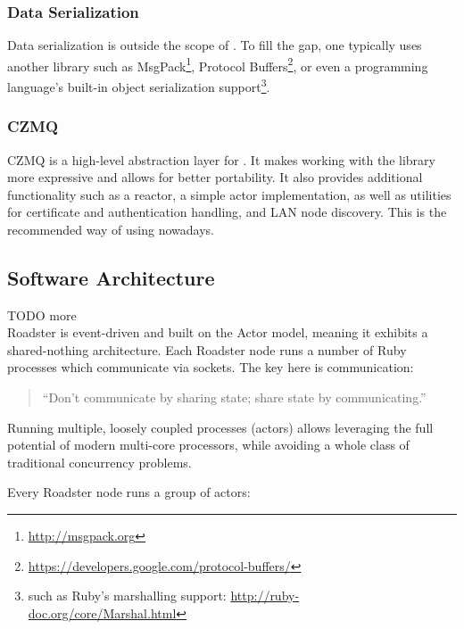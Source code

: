 \subsubsection{Data Serialization}
Data serialization is outside the scope of \zmq. To fill the gap, one typically
uses another library such as MsgPack\footnote{\url{http://msgpack.org}},
Protocol
Buffers\footnote{\url{https://developers.google.com/protocol-buffers/}}, or
even a programming language's built-in object serialization
support\footnote{such as Ruby's marshalling support:
\url{http://ruby-doc.org/core/Marshal.html}}.

\subsubsection{CZMQ}
CZMQ is a high-level abstraction layer for \zmq. It makes working with the \zmq
library more expressive and allows for better portability. It also provides
additional functionality such as a reactor, a simple actor implementation, as
well as utilities for certificate and authentication handling, and LAN node
discovery. This is the recommended way of using \zmq nowadays.

\subsection{Software Architecture}
TODO more\\

Roadster is event-driven and built on the Actor model, meaning it exhibits a
shared-nothing architecture. Each Roadster node runs a number of Ruby processes
which communicate via \zmq sockets. The key here is communication:

\begin{quote}
``Don't communicate by sharing state; share state by communicating.''
\end{quote}

Running multiple, loosely coupled processes (actors) allows leveraging the full
potential of modern multi-core processors, while avoiding a whole class of
traditional concurrency problems.

Every Roadster node runs a group of actors:

